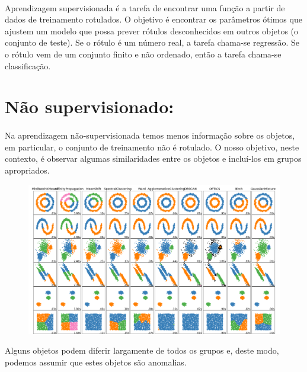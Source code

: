 \documentclass[12pt]{article}
\begin{document}
                \paragraph{}Aprendizagem supervisionada é a tarefa de encontrar uma função a partir de dados de treinamento rotulados. O objetivo é encontrar os parâmetros ótimos que ajustem um modelo que possa prever rótulos desconhecidos em outros objetos (o conjunto de teste). Se o rótulo é um número real, a tarefa chama-se regressão. Se o rótulo vem de um conjunto finito e não ordenado, então a tarefa chama-se classificação.

           \section{Não supervisionado:}
                \paragraph{}Na aprendizagem não-supervisionada temos menos informação sobre os objetos, em particular, o conjunto de treinamento não é rotulado. O nosso objetivo, neste contexto, é observar algumas similaridades entre os objetos e incluí-los em grupos apropriados. 
                
                \begin{figure}[ht]
                    \centering
                    \includegraphics[scale=0.3]{classificação de grupos.png}               
                \end{figure}
                        Alguns objetos podem diferir largamente de todos os grupos e, deste modo, podemos assumir que estes objetos são anomalias.
           
            \clearpage
\end{document}
